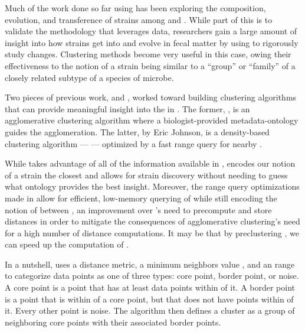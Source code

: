 Much of the work done so far using \cplop{} has been exploring the composition, evolution, and transference of strains among \hosts{} and \spec{}.
While part of this is to validate the \mst{} methodology that leverages \cplop{} data, researchers gain a large amount of insight into how \ecoli{} strains get into and evolve in fecal matter by using \pyros{} to rigorously study changes.
Clustering methods become very useful in this case, owing their effectiveness to the notion of a strain being similar to a ``group'' or ``family'' of a closely related subtype of a species of microbe.

Two pieces of previous work, \cite{montana2013algorithms, montana2013ontological} and \cite{johnson2015density}, worked toward building clustering algorithms that can provide meaningful insight into the \ecoli{} \isols{} in \cplop{}.
The former, \ohclust{}, is an agglomerative clustering algorithm where a biologist-provided metadata-ontology guides the agglomeration.
The latter, by Eric Johnson, is a density-based clustering algorithm --- \dbscan{} --- optimized by a fast range query for nearby \isols{}.

While \ohclust{} takes advantage of all of the information available in \cplop{}, \dbscan{} encodes our notion of a strain the closest and allows for strain discovery without needing to guess what ontology provides the best insight.
Moreover, the range query optimizations made in \cite{johnson2015density} allow for efficient, low-memory querying of \isols{} while still encoding the notion of \pearson{} between \isols{}, an improvement over \ohclust{}'s need to precompute and store distances in order to mitigate the consequences of agglomerative clustering's need for a high number of distance computations.
It may be that by preclustering \isols{}, we can speed up the computation of \krap{}.

In a nutshell, \dbscan{} uses a distance metric, a minimum neighbors value \minneigh{}, and an \eps{} range to categorize data points as one of three types: core point, border point, or noise.
A core point is a point that has at least \minneigh{} data points within \eps{} of it. 
A border point is a point that is within \eps{} of a core point, but that does not have \minneigh{} points within \eps{} of it. Every other point is noise. 
The algorithm then defines a cluster as a group of neighboring core points with their associated border points.


